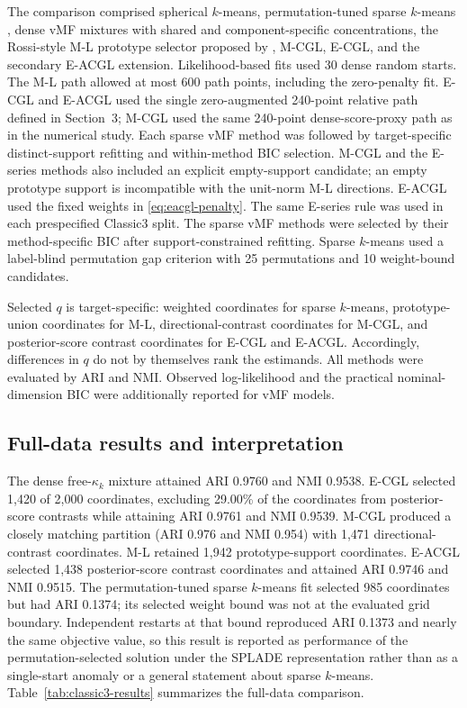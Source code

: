 \documentclass[preprint,12pt,authoryear]{elsarticle}
\begin{document}
The comparison comprised spherical $k$-means, permutation-tuned sparse
$k$-means \citep{witten2010sparseclustering}, dense vMF mixtures with shared
and component-specific concentrations, the Rossi-style M-L prototype selector
proposed by \citet{rossi2022sparsevmf}, M-CGL, E-CGL, and the secondary E-ACGL
extension.
Likelihood-based fits used
30 dense random starts.
The M-L path allowed at most 600 path points, including the zero-penalty fit.
E-CGL and E-ACGL used
the single zero-augmented 240-point relative path defined in Section~3; M-CGL
used the same 240-point dense-score-proxy path as in the numerical study.
Each sparse vMF method was followed by target-specific distinct-support
refitting and within-method BIC selection. M-CGL and the E-series methods also
included an explicit empty-support candidate; an empty prototype support is
incompatible with the unit-norm M-L directions. E-ACGL used the fixed weights
in \eqref{eq:eacgl-penalty}.
The same E-series rule was used in each prespecified Classic3 split.
The sparse vMF methods were selected by their method-specific BIC after
support-constrained refitting. Sparse $k$-means used a label-blind permutation
gap criterion with 25 permutations and 10 weight-bound candidates.

Selected $q$ is target-specific: weighted coordinates for sparse $k$-means,
prototype-union coordinates for M-L, directional-contrast coordinates for
M-CGL, and posterior-score contrast coordinates for E-CGL and E-ACGL.
Accordingly, differences in $q$ do not by themselves rank the estimands.
All methods were evaluated by ARI and NMI. Observed log-likelihood and the
practical nominal-dimension BIC were additionally reported for vMF models.

\subsection{Full-data results and interpretation}

The dense free-$\kappa_k$ mixture attained ARI 0.9760 and NMI 0.9538. E-CGL
selected 1,420 of 2,000 coordinates, excluding 29.00\% of the coordinates from
posterior-score contrasts while attaining ARI 0.9761 and NMI 0.9539.
M-CGL produced a closely matching partition (ARI 0.976 and NMI 0.954) with
1,471 directional-contrast coordinates.
M-L retained 1,942 prototype-support coordinates. E-ACGL selected 1,438
posterior-score contrast coordinates and attained ARI 0.9746 and NMI 0.9515.
The permutation-tuned sparse $k$-means fit selected 985 coordinates but had
ARI 0.1374; its selected weight bound was not at the evaluated grid boundary.
Independent restarts at that bound reproduced ARI 0.1373 and nearly the same
objective value, so this result is reported as performance of the
permutation-selected solution under the SPLADE representation rather than as
a single-start anomaly or a general statement about sparse $k$-means.
Table~\ref{tab:classic3-results} summarizes the full-data comparison.
\end{document}
